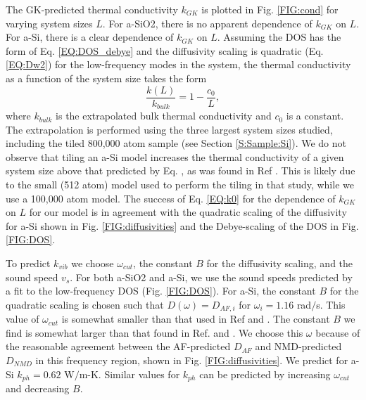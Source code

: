 \documentclass[aps,prb,onecolumn,preprint,superscriptaddress,footinbib,amsmath,amssymb,floatfix]{revtex4}
\begin{document}
The GK-predicted thermal conductivity $k_{GK}$ is plotted in 
Fig. \ref{FIG:cond} for 
varying system sizes $L$. For a-SiO2, there is no apparent dependence 
of $k_{GK}$ on $L$. For a-Si, there is a clear dependence of $k_{GK}$ on 
$L$. Assuming the DOS has the form of Eq. \eqref{EQ:DOS_debye} 
and the diffusivity scaling 
is quadratic (Eq. \eqref{EQ:Dw2}) 
for the low-frequency modes in the system, 
the thermal conductivity as a function of the system size 
takes the form
\begin{equation}\label{EQ:k0}
\frac{k(L)}{k_{bulk}} = 1 - \frac{c_0}{L},
\end{equation}
where $k_{bulk}$ is the extrapolated bulk thermal conductivity and $c_0$ 
is a constant. The extrapolation is performed using the three largest 
system sizes studied, including the tiled 800,000 atom sample (see 
Section \ref{S:Sample:Si}). 
We do not observe that tiling an a-Si model increases 
the thermal 
conductivity of a given system size above that predicted by Eq. , as 
was found in Ref . This is likely due to the 
small (512 atom) model used to perform the tiling in that study, 
while we use a 100,000 atom model. 
The success of 
Eq. \eqref{EQ:k0} for the dependence of $k_{GK}$ on 
$L$ for our model is in 
agreement with the quadratic scaling of the 
diffusivity for a-Si shown in Fig. \ref{FIG:diffusivities} 
and the Debye-scaling of the DOS in Fig. \ref{FIG:DOS}. 

To predict $k_{vib}$ we choose $\omega_{cut}$, 
the constant $B$ for the diffusivity scaling, and the sound speed 
$v_{s}$. For both a-SiO2 and a-Si, we use the sound speeds predicted 
by a fit to the low-frequency DOS (Fig. \ref{FIG:DOS}). 
For a-Si, the constant $B$ for the quadratic scaling is chosen such 
that $D(\omega) = D_{AF,i}$ for $\omega_i=1.16$ rad$/$s. This value 
of $\omega_{cut}$ is somewhat smaller than that used in Ref and . 
The constant $B$ we find is somewhat larger than that found in 
Ref. and . We choose this $\omega$ because of the reasonable agreement 
between the AF-predicted $D_{AF}$ and NMD-predicted $D_{NMD}$ in this 
frequency region, shown in Fig. \ref{FIG:diffusivities}. 
We predict for a-Si $k_{ph} = 0.62$ 
W$/$m-K. Similar values for $k_{ph}$ can be predicted by increasing 
$\omega_{cut}$ and decreasing $B$. 
\end{document}
